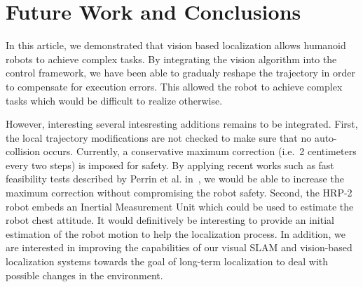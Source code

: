 \section{Future Work and Conclusions}\label{sec:conclusions}

In this article, we demonstrated that vision based localization allows
humanoid robots to achieve complex tasks. By integrating the vision
algorithm into the control framework, we have been able to gradualy
reshape the trajectory in order to compensate for execution
errors. This allowed the robot to achieve complex tasks which would be
difficult to realize otherwise.

However, interesting several intesresting additions remains to be
integrated. First, the local trajectory modifications are not checked
to make sure that no auto-collision occurs. Currently, a conservative
maximum correction (i.e.\ 2 centimeters every two steps) is imposed
for safety. By applying recent works such as fast feasibility tests
described by Perrin et al. in~\cite{Perrin10icra}, we would be able to
increase the maximum correction without compromising the robot
safety. Second, the HRP-2 robot embeds an Inertial Measurement Unit
which could be used to estimate the robot chest attitude. It would
definitively be interesting to provide an initial estimation of the
robot motion to help the localization process. In addition, we are
interested in improving the capabilities of our visual SLAM and
vision-based localization systems towards the goal of long-term
localization to deal with possible changes in the environment.


